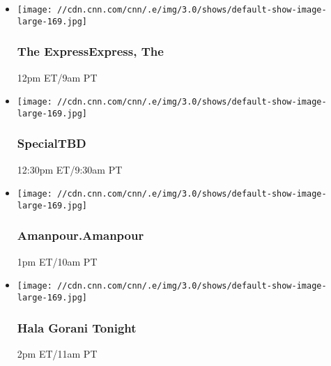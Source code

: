 \begin{itemize}
\item
  \texttt{[image: //cdn.cnn.com/cnn/.e/img/3.0/shows/default-show-image-large-169.jpg]}

  \hypertarget{the-expressexpress-the--1}{%
  \subsubsection{The ExpressExpress, The
  }\label{the-expressexpress-the--1}}

  12pm ET/9am PT
\end{itemize}

\begin{itemize}
\item
  \texttt{[image: //cdn.cnn.com/cnn/.e/img/3.0/shows/default-show-image-large-169.jpg]}

  \hypertarget{specialtbd--6}{%
  \subsubsection{SpecialTBD }\label{specialtbd--6}}

  12:30pm ET/9:30am PT
\end{itemize}

\begin{itemize}
\item
  \texttt{[image: //cdn.cnn.com/cnn/.e/img/3.0/shows/default-show-image-large-169.jpg]}

  \hypertarget{amanpouramanpour--3}{%
  \subsubsection{Amanpour.Amanpour }\label{amanpouramanpour--3}}

  1pm ET/10am PT
\end{itemize}

\begin{itemize}
\item
  \texttt{[image: //cdn.cnn.com/cnn/.e/img/3.0/shows/default-show-image-large-169.jpg]}

  \hypertarget{hala-gorani-tonight-1}{%
  \subsubsection{Hala Gorani Tonight}\label{hala-gorani-tonight-1}}

  2pm ET/11am PT
\end{itemize}

